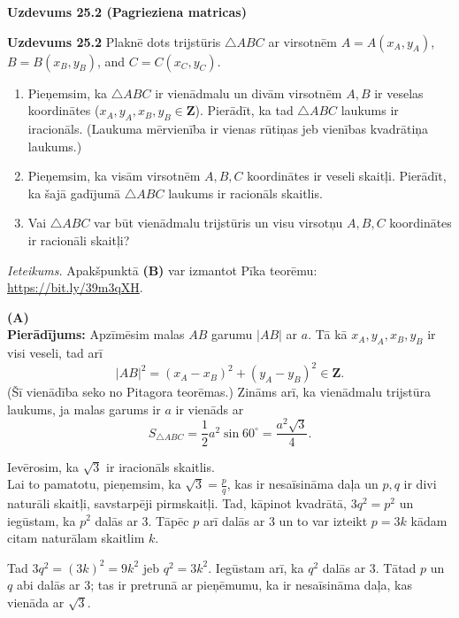 \documentclass[a4paper,12pt]{article}
\newcommand\Z{\mathbf{Z}}
\begin{document}
{\Large \bf Uzdevums 25.2 (Pagrieziena matricas)}

\vspace{10pt}
{\bf Uzdevums 25.2} Plaknē dots trijstūris $\bigtriangleup{}ABC$ ar virsotnēm $A=A(x_A,y_A)$, $B=B(x_B,y_B)$, and $C = C(x_C,y_C)$. 
\begin{enumerate}
\item Pieņemsim, ka $\bigtriangleup{}ABC$ ir vienādmalu un divām virsotnēm $A,B$ ir veselas koordinātes 
($x_A,y_A,x_B,y_B \in \Z$). Pierādīt, ka tad $\bigtriangleup{}ABC$ laukums ir iracionāls. 
(Laukuma mērvienība ir vienas rūtiņas jeb vienības kvadrātiņa laukums.)
\item Pieņemsim, ka visām virsotnēm $A,B,C$ koordinātes ir veseli skaitļi. Pierādīt, ka 
šajā gadījumā $\bigtriangleup{}ABC$ laukums ir racionāls skaitlis.
\item Vai $\bigtriangleup{}ABC$ var būt vienādmalu trijstūris un visu virsotņu $A,B,C$ koordinātes
ir racionāli skaitļi? 
\end{enumerate}


{\em Ieteikums.} Apakšpunktā {\bf (B)} var izmantot Pīka teorēmu: \url{https://bit.ly/39m3qXH}.



\vspace{10pt}
{\bf (A)}\\
{\bf Pierādījums:} Apzīmēsim malas $AB$ garumu $|AB|$ ar $a$. Tā kā $x_A,y_A,x_B,y_B$ ir visi veseli, tad arī
$$|AB|^2 = (x_A - x_B)^2 + (y_A - y_B)^2 \in \Z.$$
(Šī vienādība seko no Pitagora teorēmas.) Zināms arī, ka vienādmalu trijstūra laukums, ja malas garums ir $a$ ir vienāds ar
\begin{equation}
\label{eq:triangle}
S_{\bigtriangleup{}ABC} = \frac{1}{2} a^2 \sin{}60^{\circ} = \frac{a^2 \sqrt{3}}{4}.
\end{equation}

\vspace{5pt}
Ievērosim, ka $\sqrt{3}$ ir iracionāls skaitlis.\\
Lai to pamatotu, pieņemsim, ka $\sqrt{3} = \frac{p}{q}$, kas ir nesaīsināma daļa un $p,q$ ir divi naturāli skaitļi, savstarpēji pirmskaitļi. 
Tad, kāpinot kvadrātā, $3q^2 = p^2$ un iegūstam, ka $p^2$ dalās ar $3$. Tāpēc $p$ arī dalās ar $3$ 
un to var izteikt $p = 3k$ kādam citam naturālam skaitlim $k$. 

Tad $3q^2 = (3k)^2 = 9k^2$ jeb $q^2 = 3k^2$. Iegūstam arī, ka $q^2$ dalās ar $3$. 
Tātad $p$ un $q$ abi dalās ar $3$; tas ir pretrunā ar pieņēmumu, ka 
ir nesaīsināma daļa, kas vienāda ar $\sqrt{3}$.
\end{document}
